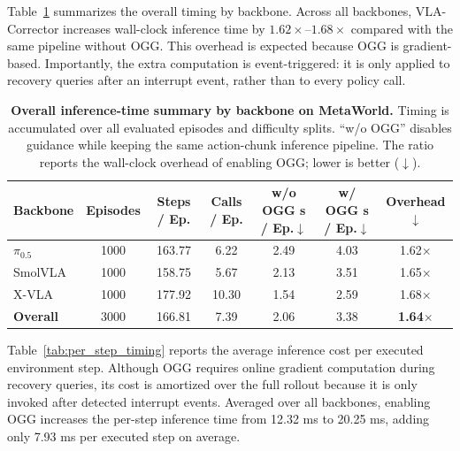 Table~\ref{tab:inference_time_model_summary} summarizes the overall timing by backbone. Across all backbones, VLA-Corrector increases wall-clock inference time by $1.62\times$--$1.68\times$ compared with the same pipeline without OGG. This overhead is expected because OGG is gradient-based. Importantly, the extra computation is event-triggered: it is only applied to recovery queries after an interrupt event, rather than to every policy call.

\begin{table}[t]
  \centering
  \small
  \setlength{\tabcolsep}{5.5pt}
  \renewcommand{\arraystretch}{1.12}
  \caption{
  \textbf{Overall inference-time summary by backbone on MetaWorld.}
  Timing is accumulated over all evaluated episodes and difficulty splits. 
  ``w/o OGG'' disables guidance while keeping the same action-chunk inference pipeline. 
  The ratio reports the wall-clock overhead of enabling OGG; lower is better ($\downarrow$).
  }
  \label{tab:inference_time_model_summary}
  \begin{tabular}{lcccccc}
    \toprule
    \rowcolor{headerbg}
    \textbf{Backbone} 
    & \textbf{Episodes} 
    & \textbf{Steps / Ep.} 
    & \textbf{Calls / Ep.} 
    & \textbf{w/o OGG s / Ep.}$\downarrow$ 
    & \textbf{w/ OGG s / Ep.}$\downarrow$ 
    & \textbf{Overhead}$\downarrow$ \\
    \midrule
    $\pi_{0.5}$ & 1000 & 163.77 & 6.22 & 2.49 & 4.03 & \cellcolor{softred}1.62$\times$ \\
    SmolVLA     & 1000 & 158.75 & 5.67 & 2.13 & 3.51 & \cellcolor{softred}1.65$\times$ \\
    X-VLA       & 1000 & 177.92 & 10.30 & 1.54 & 2.59 & \cellcolor{softred}1.68$\times$ \\
    \midrule
    \textbf{Overall} & 3000 & 166.81 & 7.39 & 2.06 & 3.38 & \cellcolor{softred}\textbf{1.64$\times$} \\
    \bottomrule
  \end{tabular}
\end{table}

Table~\ref{tab:per_step_timing} reports the average inference cost per executed environment step. Although OGG requires online gradient computation during recovery queries, its cost is amortized over the full rollout because it is only invoked after detected interrupt events. Averaged over all backbones, enabling OGG increases the per-step inference time from 12.32 ms to 20.25 ms, adding only 7.93 ms per executed step on average.

